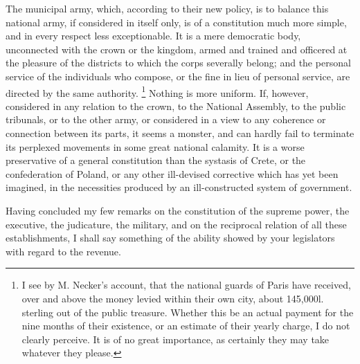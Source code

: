 The municipal army, which, according to their new policy, is to balance this national army, if considered in itself only, is of a constitution much more simple, and in every respect less exceptionable. It is a mere democratic body, unconnected with the crown or the kingdom, armed and trained and officered at the pleasure of the districts to which the corps severally belong; and the personal service of the individuals who compose, or the fine in lieu of personal service, are directed by the same authority.
\footnote{ I see by M. Necker's account, that the national guards of Paris have received, over and above the money levied within their own city, about 145,000l. sterling out of the public treasure. Whether this be an actual payment for the nine months of their existence, or an estimate of their yearly charge, I do not clearly perceive. It is of no great importance, as certainly they may take whatever they please.}
 Nothing is more uniform. If, however, considered in any relation to the crown, to the National Assembly, to the public tribunals, or to the other army, or considered in a view to any coherence or connection between its parts, it seems a monster, and can hardly fail to terminate its perplexed movements in some great national calamity. It is a worse preservative of a general constitution than the systasis of Crete, or the confederation of Poland, or any other ill-devised corrective which has yet been imagined, in the necessities produced by an ill-constructed system of government.

Having concluded my few remarks on the constitution of the supreme power, the executive, the judicature, the military, and on the reciprocal relation of all these establishments, I shall say something of the ability showed by your legislators with regard to the revenue.


